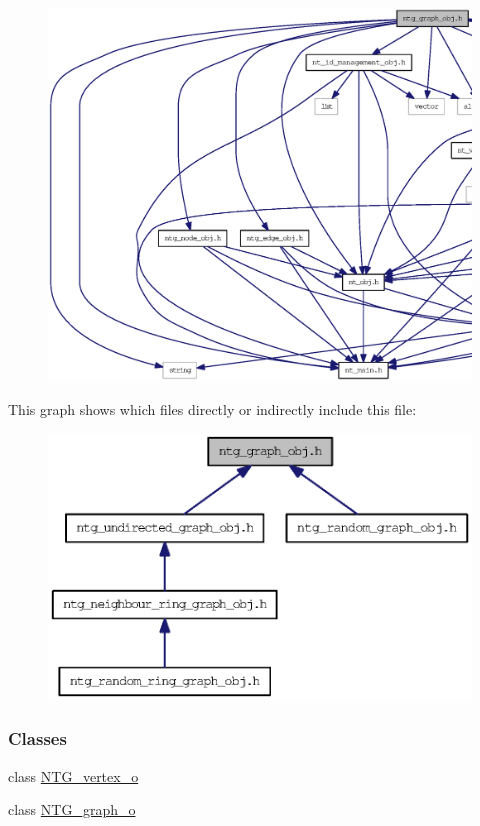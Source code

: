 \begin{figure}[H]
\begin{center}
\leavevmode
\includegraphics[width=400pt]{ntg__graph__obj_8h__incl}
\end{center}
\end{figure}
This graph shows which files directly or indirectly include this file:
\nopagebreak
\begin{figure}[H]
\begin{center}
\leavevmode
\includegraphics[width=358pt]{ntg__graph__obj_8h__dep__incl}
\end{center}
\end{figure}
\subsubsection*{Classes}
\begin{DoxyCompactItemize}
\item 
class \hyperlink{class_n_t_g__vertex__o}{NTG\_\-vertex\_\-o}
\item 
class \hyperlink{class_n_t_g__graph__o}{NTG\_\-graph\_\-o}
\end{DoxyCompactItemize}

